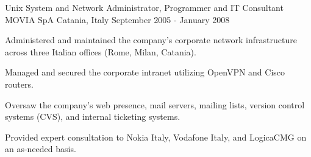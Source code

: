 \begin{cventries}
  \cventry
  {Unix System and Network Administrator, Programmer and IT Consultant} %
  {MOVIA SpA} %
  {Catania, Italy} %
  {September 2005 - January 2008} %
  {
    \begin{cvitems} %
      \item Administered and maintained the company's corporate network infrastructure across three Italian offices (Rome, Milan, Catania).
      \item Managed and secured the corporate intranet utilizing OpenVPN and Cisco routers.
      \item Oversaw the company's web presence, mail servers, mailing lists, version control systems (CVS), and internal ticketing systems.
      \item Provided expert consultation to Nokia Italy, Vodafone Italy, and LogicaCMG on an as-needed basis.
    \end{cvitems}
  }

\end{cventries}
